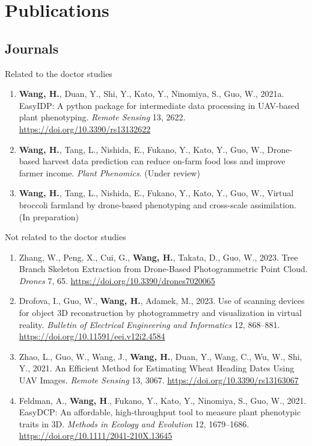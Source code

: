 \chapter*{Publications}

\begin{singlespace}
\section*{Journals}

\noindent
Related to the doctor studies

\begin{enumerate}
  \item \textbf{Wang, H.}, Duan, Y., Shi, Y., Kato, Y., Ninomiya, S., Guo, W., 2021a. EasyIDP: A python package for intermediate data processing in UAV-based plant phenotyping. \textit{Remote Sensing} 13, 2622. \url{https://doi.org/10.3390/rs13132622}
  \item \textbf{Wang, H.}, Tang, L., Nishida, E., Fukano, Y., Kato, Y., Guo, W., Drone-based harvest data prediction can reduce on-farm food loss and improve farmer income. \textit{Plant Phenomics}. (Under review)
  \item \textbf{Wang, H.}, Tang, L., Nishida, E., Fukano, Y., Kato, Y., Guo, W., Virtual broccoli farmland by drone-based phenotyping and cross-scale assimilation. (In preparation)
\end{enumerate}

\noindent
Not related to the doctor studies

\begin{enumerate}
  \item Zhang, W., Peng, X., Cui, G., \textbf{Wang, H.}, Takata, D., Guo, W., 2023. Tree Branch Skeleton Extraction from Drone-Based Photogrammetric Point Cloud. \textit{Drones} 7, 65. \url{https://doi.org/10.3390/drones7020065}
  \item Drofova, I., Guo, W., \textbf{Wang, H.}, Adamek, M., 2023. Use of scanning devices for object 3D reconstruction by photogrammetry and visualization in virtual reality. \textit{Bulletin of Electrical Engineering and Informatics} 12, 868–881. \url{https://doi.org/10.11591/eei.v12i2.4584}
  \item Zhao, L., Guo, W., Wang, J., \textbf{Wang, H.}, Duan, Y., Wang, C., Wu, W., Shi, Y., 2021. An Efficient Method for Estimating Wheat Heading Dates Using UAV Images. \textit{Remote Sensing} 13, 3067. \url{https://doi.org/10.3390/rs13163067}
  \item Feldman, A., \textbf{Wang, H}., Fukano, Y., Kato, Y., Ninomiya, S., Guo, W., 2021. EasyDCP: An affordable, high-throughput tool to measure plant phenotypic traits in 3D. \textit{Methods in Ecology and Evolution} 12, 1679–1686. \url{https://doi.org/10.1111/2041-210X.13645}
  

\end{enumerate}
\end{singlespace}
